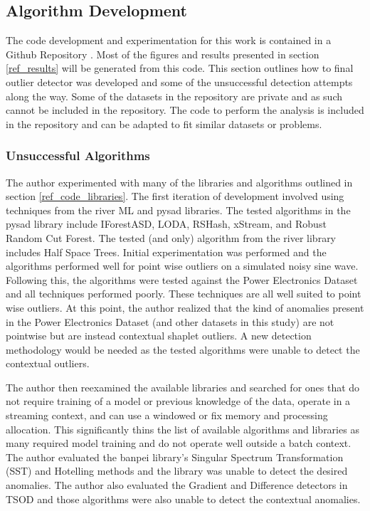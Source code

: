 \subsection{Algorithm Development}

The code development and experimentation for this work is contained in a Github Repository \cite{BeattieGithub2022}. Most of the figures and results presented in section \ref{ref_results} will be generated from this code. This section outlines how to final outlier detector was developed and some of the unsuccessful detection attempts along the way. Some of the datasets in the repository are private and as such cannot be included in the repository. The code to perform the analysis is included in the repository and can be adapted to fit similar datasets or problems.

\subsubsection{Unsuccessful Algorithms}

The author experimented with many of the libraries and algorithms outlined in section \ref{ref_code_libraries}. The first iteration of development involved using techniques from the river ML \cite{2020river} and pysad \cite{pysad} libraries.  The tested algorithms in the pysad library include IForestASD, LODA, RSHash, xStream, and Robust Random Cut Forest. The tested (and only) algorithm from the river library includes Half Space Trees. Initial experimentation was performed and the algorithms performed well for point wise outliers on a simulated noisy sine wave. Following this, the algorithms were tested against the Power Electronics Dataset and all techniques performed poorly. These techniques are all well suited to point wise outliers. At this point, the author realized that the kind of anomalies present in the Power Electronics Dataset (and other datasets in this study) are not pointwise but are instead contextual shaplet outliers. A new detection methodology would be needed as the tested algorithms were unable to detect the contextual outliers.

The author then reexamined the available libraries and searched for ones that do not require training of a model or previous knowledge of the data, operate in a streaming context, and can use a windowed or fix memory and processing allocation. This significantly thins the list of available algorithms and libraries as many required model training and do not operate well outside a batch context. The author evaluated the banpei \cite{banpei} library's Singular Spectrum Transformation (SST) and Hotelling methods and the library was unable to detect the desired anomalies. The author also evaluated the Gradient and Difference detectors in TSOD \cite{tsod} and those algorithms were also unable to detect the contextual anomalies.

